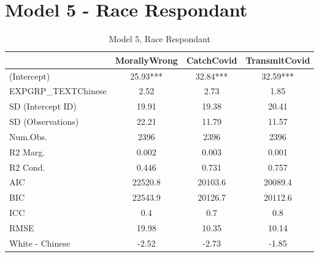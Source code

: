 \documentclass[]{report}
\begin{document}
\chapter{Model 5 -  Race Respondant}

\begin{table}
	
	\caption{Model 5, Race Respondant}
	\centering
	\begin{tabular}[t]{lccc}
		\toprule
		& MorallyWrong & CatchCovid & TransmitCovid\\
		\midrule
		(Intercept) & \num{25.93}*** & \num{32.84}*** & \num{32.59}***\\
		EXPGRP\_TEXTChinese & \num{2.52} & \num{2.73} & \num{1.85}\\
		SD (Intercept ID) & \num{19.91} & \num{19.38} & \num{20.41}\\
		SD (Observations) & \num{22.21} & \num{11.79} & \num{11.57}\\
		\midrule
		Num.Obs. & \num{2396} & \num{2396} & \num{2396}\\
		R2 Marg. & \num{0.002} & \num{0.003} & \num{0.001}\\
		R2 Cond. & \num{0.446} & \num{0.731} & \num{0.757}\\
		AIC & \num{22520.8} & \num{20103.6} & \num{20089.4}\\
		BIC & \num{22543.9} & \num{20126.7} & \num{20112.6}\\
		ICC & \num{0.4} & \num{0.7} & \num{0.8}\\
		RMSE & \num{19.98} & \num{10.35} & \num{10.14}\\
		\midrule
		White - Chinese & -2.52 & -2.73 & -1.85 \\ 
		\bottomrule
	\end{tabular}
\end{table}



\end{document}
